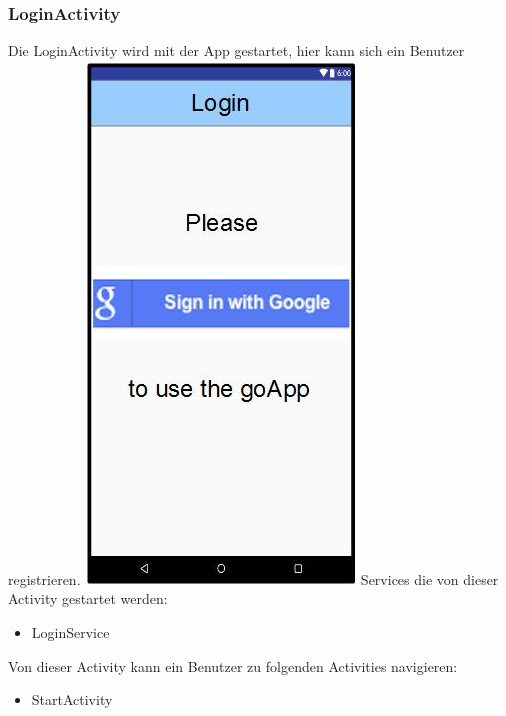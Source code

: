 	\subsubsection {LoginActivity}
	Die LoginActivity wird mit der App gestartet, hier kann sich ein Benutzer registrieren.
	\newline
	\includegraphics[width=.3\textwidth]{GUI_Login.jpg}
	\newline
	Services die von dieser Activity gestartet werden:
	\begin{itemize}
	\item LoginService
	\end{itemize}
	Von dieser Activity kann ein Benutzer zu folgenden Activities navigieren:
	\begin{itemize} 
	 \item StartActivity
	\end{itemize}
	
